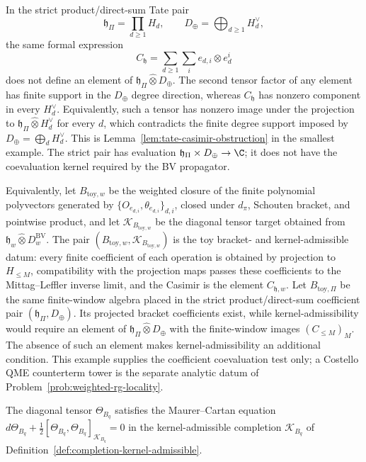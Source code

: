 \begin{ex}
In the strict product/direct-sum Tate pair
\[
  \mathfrak h_\Pi=\prod_{d\ge1}H_d,\qquad
  D_\oplus=\bigoplus_{d\ge1}H_d^\vee ,
\]
the same formal expression
\[
  C_{\mathfrak h}=\sum_{d\ge1}\sum_i e_{d,i}\otimes e^i_d
\]
does not define an element of
\(\mathfrak h_\Pi\widehat\otimes D_\oplus\).  The second tensor factor
of any element has finite support in the \(D_\oplus\) degree direction,
whereas \(C_{\mathfrak h}\) has nonzero component in every
\(H_d^\vee\).  Equivalently, such a tensor has nonzero image under
the projection to
\(\mathfrak h_\Pi\widehat\otimes H_d^\vee\) for every \(d\), which
contradicts the finite degree support imposed by
\(D_\oplus=\bigoplus_d H_d^\vee\).  This is
Lemma~\ref{lem:tate-casimir-obstruction} in the smallest example.  The
strict pair has evaluation
\(\mathfrak h_\Pi\times D_\oplus\to\C\); it does not have the
coevaluation kernel required by the BV propagator.

Equivalently, let \(B_{\mathrm{toy},w}\) be the weighted closure of the
finite polynomial polyvectors generated by
\(\{O_{e_{d,i}},\theta_{e_{d,i}}\}_{d,i}\), closed under \(d_\pi\),
Schouten bracket, and pointwise product, and let
\(\mathcal K_{B_{\mathrm{toy},w}}\) be the diagonal tensor target
obtained from
\(\mathfrak h_w\widehat\otimes
D^{\mathrm{BV}}_w\).  The pair
\((B_{\mathrm{toy},w},\mathcal K_{B_{\mathrm{toy},w}})\) is the toy
bracket- and kernel-admissible datum: every finite coefficient of each
operation is obtained by projection to \(H_{\le M}\), compatibility
with the projection maps passes these coefficients to the
Mittag--Leffler inverse limit, and the Casimir is the element
\(C_{\mathfrak h,w}\).  Let \(B_{\mathrm{toy},\Pi}\) be the same
finite-window algebra placed in the strict product/direct-sum coefficient
pair \((\mathfrak h_\Pi,D_\oplus)\).  Its projected bracket
coefficients exist, while kernel-admissibility would require an element of
\(\mathfrak h_\Pi\widehat\otimes D_\oplus\) with the finite-window images
\((C_{\le M})_M\).  The absence of such an element makes
kernel-admissibility an additional condition.  This example supplies the coefficient
coevaluation test only; a Costello QME counterterm tower is the separate
analytic datum of Problem~\ref{prob:weighted-rg-locality}.
\end{ex}

\begin{thm}
\label{thm:completion-mc-kernel}
The diagonal tensor \(\Theta_{B_q}\) satisfies the Maurer--Cartan
equation
\(d\Theta_{B_q}+\tfrac12[\Theta_{B_q},\Theta_{B_q}]_{\mathcal K_{B_q}}=0\)
in the kernel-admissible completion \(\mathcal K_{B_q}\) of
Definition~\ref{def:completion-kernel-admissible}.
\end{thm}

